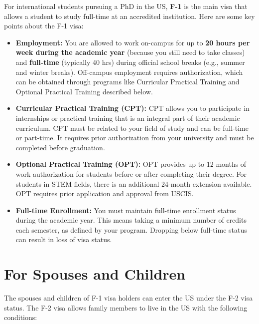 \documentclass[oneside,11pt,dvipsnames]{book}
\begin{document}

For international students pursuing a PhD in the US, \textbf{F-1} is the main visa that allows a student to study full-time at an accredited institution.  Here are some key points about the F-1 visa:

\begin{itemize}
\item \textbf{Employment:} You are allowed to work on-campus for up to \textbf{20 hours per week during the academic year} (because you still need to take classes) and \textbf{full-time} (typically 40 hrs) during official school breaks (e.g., summer and winter breaks). Off-campus employment requires authorization, which can be obtained through programs like Curricular Practical Training and Optional Practical Training described below.

\item \textbf{Curricular Practical Training (CPT):} CPT allows you to participate in internships or practical training that is an integral part of their academic curriculum. CPT must be related to your field of study and can be full-time or part-time. It requires prior authorization from your university and must be completed before graduation.

\item \textbf{Optional Practical Training (OPT):} OPT provides up to 12 months of work authorization for students before or after completing their degree. For students in STEM fields, there is an additional 24-month extension available. OPT requires prior application and approval from USCIS.

\item \textbf{Full-time Enrollment:} You must maintain full-time enrollment status during the academic year. This means taking a minimum number of credits each semester, as defined by your program. Dropping below full-time status can result in loss of visa status.
\end{itemize}




\section{For Spouses and Children}

The spouses and children of F-1 visa holders can enter the US under the F-2 visa status. The F-2 visa allows family members to live in the US with the following conditions:
\end{document}
